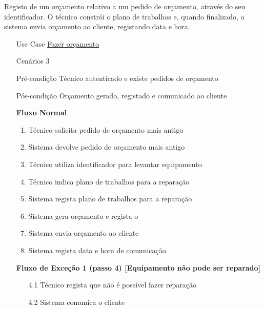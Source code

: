 \documentclass[../relatorio.tex]{subfiles}
\begin{document}
Registo de um orçamento relativo a um pedido de orçamento, através do seu identificador.
O técnico constrói o plano de trabalhos e, quando finalizado, o sistema envia orçamento ao cliente,
registando data e hora.
\begin{itemize}
    \item[Use Case] {\underline{Fazer orçamento}}
    \item[Cenários] {3}
    \item[Pré-condição] {Técnico autenticado e existe pedidos de orçamento}
    \item[Pós-condição] {Orçamento gerado, registado e comunicado ao cliente}
          \begin{flushleft}
              \textbf{Fluxo Normal}
          \end{flushleft}
          \begin{enumerate}
              \item Técnico solicita pedido de orçamento mais antigo
              \item Sistema devolve pedido de orçamento mais antigo
              \item Técnico utiliza identificador para levantar equipamento
              \item Técnico indica plano de trabalhos para a reparação
              \item Sistema regista plano de trabalhos para a reparação
              \item Sistema gera orçamento e regista-o
              \item Sistema envia orçamento ao cliente
              \item Sistema regista data e hora de comunicação
          \end{enumerate}
          \begin{flushleft}
              \textbf{Fluxo de Exceção 1 (passo 4) [Equipamento não pode ser reparado]}
          \end{flushleft}
          \begin{itemize}
              \item[4.1] {Técnico regista que não é possível fazer reparação}
              \item[4.2] {Sistema comunica o cliente}
          \end{itemize}
\end{itemize}
\end{document}
